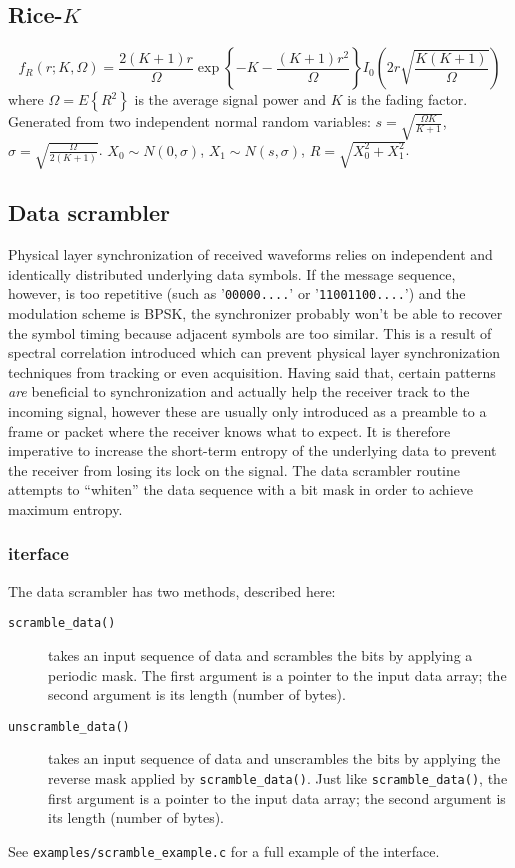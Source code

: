 \subsection{Rice-$K$}
\[
    f_R(r;K,\Omega) = 
        \frac{2(K+1)r}{\Omega}
        \exp\left\{-K-\frac{(K+1)r^2}{\Omega}\right\}
        I_0\left( 2r\sqrt{\frac{K(K+1)}{\Omega}} \right)
\]
where $\Omega=E\left\{R^2\right\}$ is the average signal power and $K$ is the
fading factor.
Generated from two independent normal random variables:
$s = \sqrt{\frac{\Omega K}{K+1}}$,
$\sigma = \sqrt{\frac{\Omega}{2(K+1)}}$.
$X_0 \sim N(0,\sigma)$,
$X_1 \sim N(s,\sigma)$,
$R = \sqrt{X_0^2 + X_1^2}$.


\subsection{Data scrambler}
Physical layer synchronization of received waveforms relies on independent and
identically distributed underlying data symbols.
If the message sequence, however, is too repetitive
(such as '{\tt 00000....}' or '{\tt 11001100....}')
and the modulation scheme is BPSK, the synchronizer probably won't be able to
recover the symbol timing because adjacent symbols are too similar.
This is a result of spectral correlation introduced which can prevent physical
layer synchronization techniques from tracking or even acquisition.
Having said that, certain patterns {\em are} beneficial to synchronization and
actually help the receiver track to the incoming signal, however these are
usually only introduced as a preamble to a frame or packet where the receiver
knows what to expect.
It is therefore imperative to increase the short-term entropy of the
underlying data to prevent the receiver from losing its lock on the signal.
The data scrambler routine attempts to ``whiten'' the data sequence with a bit
mask in order to achieve maximum entropy.

\subsubsection{iterface}
The data scrambler has two methods, described here:
\begin{description}
\item[{\tt scramble\_data()}]
    takes an input sequence of data and scrambles the bits by applying a
    periodic mask.
    The first argument is a pointer to the input data array; the second
    argument is its length (number of bytes).
\item[{\tt unscramble\_data()}]
    takes an input sequence of data and unscrambles the bits by applying the
    reverse mask applied by {\tt scramble\_data()}.
    Just like {\tt scramble\_data()}, the first argument is a pointer to the
    input data array; the second argument is its length (number of bytes).
\end{description}

See {\tt examples/scramble\_example.c} for a full example of the interface.

